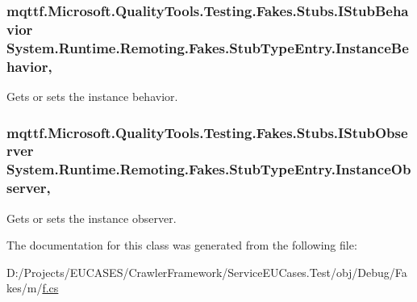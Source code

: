 \hypertarget{class_system_1_1_runtime_1_1_remoting_1_1_fakes_1_1_stub_type_entry_a08508c68e40a04b762b6c6eb4337fd07}{
\subsubsection[{Instance\-Behavior}]{\setlength{\rightskip}{0pt plus 5cm}mqttf.\-Microsoft.\-Quality\-Tools.\-Testing.\-Fakes.\-Stubs.\-I\-Stub\-Behavior System.\-Runtime.\-Remoting.\-Fakes.\-Stub\-Type\-Entry.\-Instance\-Behavior\hspace{0.3cm}{\ttfamily [get]}, {\ttfamily [set]}}}\label{class_system_1_1_runtime_1_1_remoting_1_1_fakes_1_1_stub_type_entry_a08508c68e40a04b762b6c6eb4337fd07}


Gets or sets the instance behavior.

\hypertarget{class_system_1_1_runtime_1_1_remoting_1_1_fakes_1_1_stub_type_entry_a255f7ddb7a89d310c9b396fe83ca8c41}{
\subsubsection[{Instance\-Observer}]{\setlength{\rightskip}{0pt plus 5cm}mqttf.\-Microsoft.\-Quality\-Tools.\-Testing.\-Fakes.\-Stubs.\-I\-Stub\-Observer System.\-Runtime.\-Remoting.\-Fakes.\-Stub\-Type\-Entry.\-Instance\-Observer\hspace{0.3cm}{\ttfamily [get]}, {\ttfamily [set]}}}\label{class_system_1_1_runtime_1_1_remoting_1_1_fakes_1_1_stub_type_entry_a255f7ddb7a89d310c9b396fe83ca8c41}


Gets or sets the instance observer.



The documentation for this class was generated from the following file\-:\begin{DoxyCompactItemize}
\item 
D\-:/\-Projects/\-E\-U\-C\-A\-S\-E\-S/\-Crawler\-Framework/\-Service\-E\-U\-Cases.\-Test/obj/\-Debug/\-Fakes/m/\hyperlink{m_2f_8cs}{f.\-cs}\end{DoxyCompactItemize}

